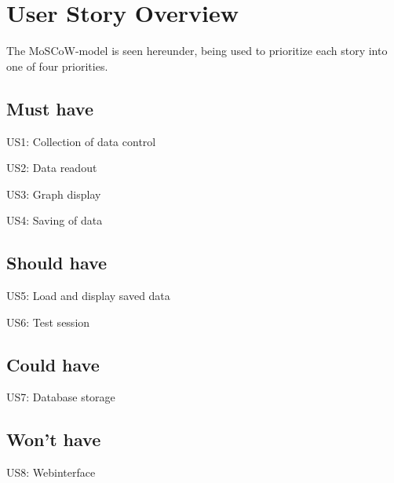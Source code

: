\section{User Story Overview}
\label{sec:UserStoryOverview}

The MoSCoW-model is seen hereunder, being used to prioritize each story into one of four priorities. 

\subsection{Must have}

US1: Collection of data control

US2: Data readout

US3: Graph display

US4: Saving of data

\subsection{Should have}

US5: Load and display saved data

US6: Test session

\subsection{Could have}

US7: Database storage

\subsection{Won't have}

US8: Webinterface